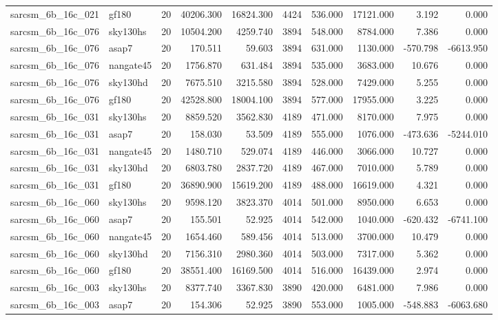 \begin{tabular}{llrrrrrrrr}
sarcsm\_6b\_16c\_021 & gf180 & 20 & 40206.300 & 16824.300 & 4424 & 536.000 & 17121.000 & 3.192 & 0.000 \\
sarcsm\_6b\_16c\_076 & sky130hs & 20 & 10504.200 & 4259.740 & 3894 & 548.000 & 8784.000 & 7.386 & 0.000 \\
sarcsm\_6b\_16c\_076 & asap7 & 20 & 170.511 & 59.603 & 3894 & 631.000 & 1130.000 & -570.798 & -6613.950 \\
sarcsm\_6b\_16c\_076 & nangate45 & 20 & 1756.870 & 631.484 & 3894 & 535.000 & 3683.000 & 10.676 & 0.000 \\
sarcsm\_6b\_16c\_076 & sky130hd & 20 & 7675.510 & 3215.580 & 3894 & 528.000 & 7429.000 & 5.255 & 0.000 \\
sarcsm\_6b\_16c\_076 & gf180 & 20 & 42528.800 & 18004.100 & 3894 & 577.000 & 17955.000 & 3.225 & 0.000 \\
sarcsm\_6b\_16c\_031 & sky130hs & 20 & 8859.520 & 3562.830 & 4189 & 471.000 & 8170.000 & 7.975 & 0.000 \\
sarcsm\_6b\_16c\_031 & asap7 & 20 & 158.030 & 53.509 & 4189 & 555.000 & 1076.000 & -473.636 & -5244.010 \\
sarcsm\_6b\_16c\_031 & nangate45 & 20 & 1480.710 & 529.074 & 4189 & 446.000 & 3066.000 & 10.727 & 0.000 \\
sarcsm\_6b\_16c\_031 & sky130hd & 20 & 6803.780 & 2837.720 & 4189 & 467.000 & 7010.000 & 5.789 & 0.000 \\
sarcsm\_6b\_16c\_031 & gf180 & 20 & 36890.900 & 15619.200 & 4189 & 488.000 & 16619.000 & 4.321 & 0.000 \\
sarcsm\_6b\_16c\_060 & sky130hs & 20 & 9598.120 & 3823.370 & 4014 & 501.000 & 8950.000 & 6.653 & 0.000 \\
sarcsm\_6b\_16c\_060 & asap7 & 20 & 155.501 & 52.925 & 4014 & 542.000 & 1040.000 & -620.432 & -6741.100 \\
sarcsm\_6b\_16c\_060 & nangate45 & 20 & 1654.460 & 589.456 & 4014 & 513.000 & 3700.000 & 10.479 & 0.000 \\
sarcsm\_6b\_16c\_060 & sky130hd & 20 & 7156.310 & 2980.360 & 4014 & 503.000 & 7317.000 & 5.362 & 0.000 \\
sarcsm\_6b\_16c\_060 & gf180 & 20 & 38551.400 & 16169.500 & 4014 & 516.000 & 16439.000 & 2.974 & 0.000 \\
sarcsm\_6b\_16c\_003 & sky130hs & 20 & 8377.740 & 3367.830 & 3890 & 420.000 & 6481.000 & 7.986 & 0.000 \\
sarcsm\_6b\_16c\_003 & asap7 & 20 & 154.306 & 52.925 & 3890 & 553.000 & 1005.000 & -548.883 & -6063.680 \\

\end{tabular}

